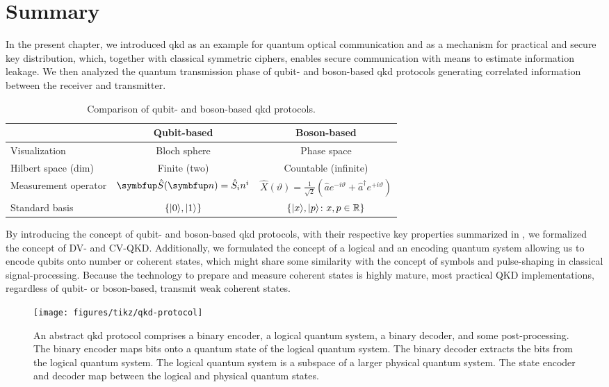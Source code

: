 \section*{Summary}

In the present chapter, we introduced \gls{qkd} as an example for quantum optical communication and as a mechanism for practical and secure key distribution, which, together with classical symmetric ciphers, enables secure communication with means to estimate information leakage.
We then analyzed the quantum transmission phase of qubit- and boson-based \gls{qkd} protocols generating correlated information between the receiver and transmitter.
\begin{table}[htb]
	\centering	
	\begin{tabular}{lcc}
		\toprule
			& Qubit-based & Boson-based \\
		\midrule
			Visualization & Bloch sphere & Phase space \\
			Hilbert space (dim) & Finite (two) & Countable (infinite) \\
			Measurement operator & $\vb{\hat{S}}(\vb{n})=\hat{S}_in^i$ & $\hat{X}(\vartheta)=\frac{1}{\sqrt{2}}\left(\hat{a}e^{-i\vartheta}+\hat{a}^\dagger e^{+i\vartheta}\right)$ \\
			Standard basis & $\left\{\lvert0\rangle,\lvert1\rangle\right\}$ & $\left\{\lvert x\rangle,\lvert p\rangle\colon x,p\in\mathbb{R}\right\}$ \\
		\bottomrule
	\end{tabular}
	\caption{Comparison of qubit- and boson-based \gls{qkd} protocols.}\label{tab:qkd_comparison}
\end{table}
By introducing the concept of qubit- and boson-based \gls{qkd} protocols, with their respective key properties summarized in , we formalized the concept of DV- and CV-QKD.
Additionally, we formulated the concept of a logical and an encoding quantum system allowing us to encode qubits onto number or coherent states, which might share some similarity with the concept of symbols and pulse-shaping in classical signal-processing.
Because the technology to prepare and measure coherent states is highly mature, most practical QKD implementations, regardless of qubit- or boson-based, transmit weak coherent states.
\begin{figure}[htb]
	\centering
	\texttt{[image: figures/tikz/qkd-protocol]}
	\caption{An abstract \gls{qkd} protocol comprises a binary encoder, a logical quantum system, a binary decoder, and some post-processing. The binary encoder maps bits onto a quantum state of the logical quantum system. The binary decoder extracts the bits from the logical quantum system. The logical quantum system is a subspace of a larger physical quantum system. The state encoder and decoder map between the logical and physical quantum states.}\label{fig:qkd_protocol}
\end{figure}
